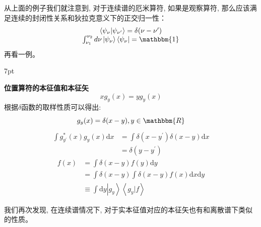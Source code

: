 \documentclass[a4paper,zihao=-4,linespread=1]{ctexrep}
\newenvironment{thinknote}{%
\def\FrameCommand{%
\hspace{1pt}%
{\color{BurlyWood}\vrule width 2pt}%
{\color{formalshade}\vrule width 4pt}%
\colorbox{formalshade}%
}%
\MakeFramed{\advance\hsize-\width\FrameRestore}%
\noindent\hspace{-4.55pt}%
\begin{adjustwidth}{}{7pt}%
\vspace{2pt}\vspace{2pt}%
}
{%
\vspace{2pt}\end{adjustwidth}\endMakeFramed%
}
\begin{document}
    从上面的例子我们就注意到, 对于连续谱的厄米算符, 如果是观察算符, 那么应该满足连续的封闭性关系和狄拉克意义下的正交归一性：
    \begin{equation*}
        \begin{array}{c}
            \left \langle \psi_\nu   | \psi_{\nu^\prime }  \right \rangle=\delta (\nu -\nu ^\prime ) \\
            \int_{{\nu _1}}^{{\nu _2}} {d\nu \left| {{\psi _\nu }} \right\rangle \left\langle {{\psi _\nu }} \right|} =\mathbbm{1}
        \end{array}
    \end{equation*}
    再看一例。
    \begin{thinknote}
        \textbf{位置算符的本征值和本征矢}
        \begin{equation}
            xg_y(x)=yg_y(x)
        \end{equation}
        根据$\delta$函数的取样性质可以得出:
        \[g_y(x)=\delta(x-y),y\in\mathbbm{R}\]
        \begin{align*}
            \int g_{y^\prime} ^*(x)g_y(x)\mathrm{d}x & = \int \delta (x-y^\prime )\delta(x-y)\mathrm{d}x\\ 
            & = \delta (y-y^\prime )
        \end{align*}
        \begin{align*}
            f(x)&=\int\delta(x-y)f(y)\mathrm{d}y\\
                &=\int\delta(x-y)\int\delta(x-y)f(x)\mathrm{d}x\mathrm{d}y\\
                &\equiv\int\mathrm{d}y\left | g_y \right \rangle\left \langle g_y  | f \right \rangle   
        \end{align*}
    \end{thinknote}
    我们再次发现, 在连续谱情况下, 对于实本征值对应的本征矢也有和离散谱下类似的性质。
\end{document}
